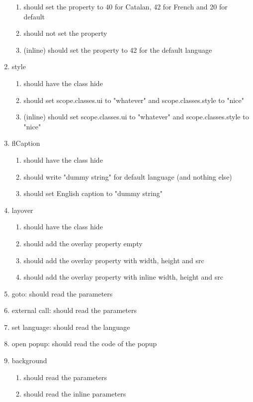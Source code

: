 \begin{singlespace}
\begin{enumerate}
\begin{enumerate}
\item         should set the property to 40 for Catalan, 42 for French and 20 for default
\item         should not set the property
\item         (inline) should set the property to 42 for the default language
\end{enumerate}
\item     style
\begin{enumerate}
\item         should have the class hide
\item         should set scope.classes.ui to "whatever" and scope.classes.style to "nice"
\item         (inline) should set scope.classes.ui to "whatever" and scope.classes.style to "nice"
\end{enumerate}
\item     flCaption
\begin{enumerate}
\item         should have the class hide
\item         should write "dummy string" for default language (and nothing else)
\item         should set English caption to "dummy string"
\end{enumerate}
\item     layover
\begin{enumerate}
\item         should have the class hide
\item         should add the overlay property empty
\item         should add the overlay property with width, height and src
\item         should add the overlay property with inline width, height and src
\end{enumerate}
\item     goto: should read the parameters
\item     external call: should read the parameters
\item     set language: should read the language
\item     open popup: should read the code of the popup
\item     background
\begin{enumerate}
\item         should read the parameters
\item         should read the inline parameters
\end{enumerate}
\end{enumerate}


\end{singlespace}
